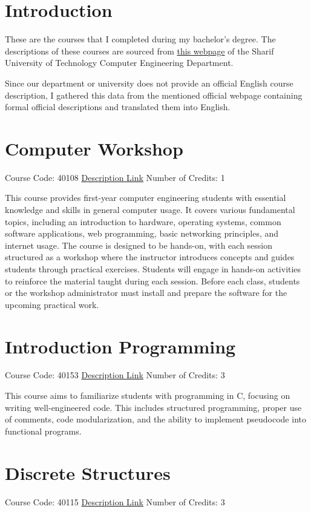 \section*{Introduction}
These are the courses that I completed during my bachelor's degree. The descriptions of these courses are sourced from  \href{https://docs.ce.sharif.edu/course/}{this webpage} of the Sharif University of Technology Computer Engineering Department.

Since our department or university does not provide an official English course description, I gathered this data from the mentioned official webpage containing formal official descriptions and translated them into English.
\newpage
\tableofcontents
\newpage


\section{Computer Workshop}
Course Code: 40108 \qquad \quad \href{https://docs.ce.sharif.edu/course/40108}{Description Link}
\qquad \quad Number of Credits: 1

This course provides first-year computer engineering students with essential knowledge and skills in general computer usage. It covers various fundamental topics, including an introduction to hardware, operating systems, common software applications, web programming, basic networking principles, and internet usage. The course is designed to be hands-on, with each session structured as a workshop where the instructor introduces concepts and guides students through practical exercises. Students will engage in hands-on activities to reinforce the material taught during each session. Before each class, students or the workshop administrator must install and prepare the software for the upcoming practical work.

\section{Introduction Programming}
Course Code: 40153 \qquad \quad \href{https://docs.ce.sharif.edu/course/40153}{Description Link}
\qquad \quad Number of Credits: 3

This course aims to familiarize students with programming in C, focusing on writing well-engineered code. This includes structured programming, proper use of comments, code modularization, and the ability to implement pseudocode into functional programs.

\section{Discrete Structures}
Course Code: 40115 \qquad \quad \href{https://docs.ce.sharif.edu/course/40115}{Description Link}
\qquad \quad Number of Credits: 3

